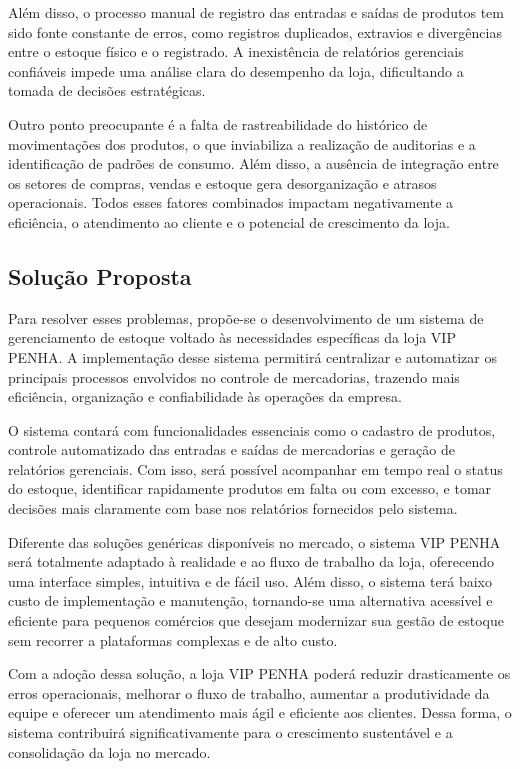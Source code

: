 \documentclass[
	12pt,				%
	openany,			%
	twoside,			%
	a4paper,			%
	english,			%
	brazil				%
	]{abntex2}
\begin{document}
Além disso, o processo manual de registro das entradas e saídas de produtos tem sido fonte constante de erros, como registros duplicados, extravios e divergências entre o estoque físico e o registrado. A inexistência de relatórios gerenciais confiáveis impede uma análise clara do desempenho da loja, dificultando a tomada de decisões estratégicas.

Outro ponto preocupante é a falta de rastreabilidade do histórico de movimentações dos produtos, o que inviabiliza a realização de auditorias e a identificação de padrões de consumo. Além disso, a ausência de integração entre os setores de compras, vendas e estoque gera desorganização e atrasos operacionais. Todos esses fatores combinados impactam negativamente a eficiência, o atendimento ao cliente e o potencial de crescimento da loja.


\subsection{Solução Proposta}

Para resolver esses problemas, propõe-se o desenvolvimento de um sistema de gerenciamento de estoque voltado às necessidades específicas da loja VIP PENHA. A implementação desse sistema permitirá centralizar e automatizar os principais processos envolvidos no controle de mercadorias, trazendo mais eficiência, organização e confiabilidade às operações da empresa.

O sistema contará com funcionalidades essenciais como o cadastro de produtos, controle automatizado das entradas e saídas de mercadorias e geração de relatórios gerenciais. Com isso, será possível acompanhar em tempo real o status do estoque, identificar rapidamente produtos em falta ou com excesso, e tomar decisões mais claramente com base nos relatórios fornecidos pelo sistema.

Diferente das soluções genéricas disponíveis no mercado, o sistema VIP PENHA será totalmente adaptado à realidade e ao fluxo de trabalho da loja, oferecendo uma interface simples, intuitiva e de fácil uso. Além disso, o sistema terá baixo custo de implementação e manutenção, tornando-se uma alternativa acessível e eficiente para pequenos comércios que desejam modernizar sua gestão de estoque sem recorrer a plataformas complexas e de alto custo.

Com a adoção dessa solução, a loja VIP PENHA poderá reduzir drasticamente os erros operacionais, melhorar o fluxo de trabalho, aumentar a produtividade da equipe e oferecer um atendimento mais ágil e eficiente aos clientes. Dessa forma, o sistema contribuirá significativamente para o crescimento sustentável e a consolidação da loja no mercado.
 
\end{document}
